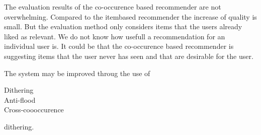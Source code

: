 The evaluation results of the co-occurence based recommender are not overwhelming. Compared to the \gls{itembased} recommender the increase of quality is small. But the evaluation method only considers items that the users already liked as relevant. We do not know how usefull a recommendation for an individual user is. It could be that the co-occurence based recommender is suggesting items that the user never has seen and that are desirable for the user.

The system may be improved throug the use of 
\begin{description}
\item[Dithering] 
\item[Anti-flood] 
\item[Cross-coooccurence]
\end{description}
dithering.

